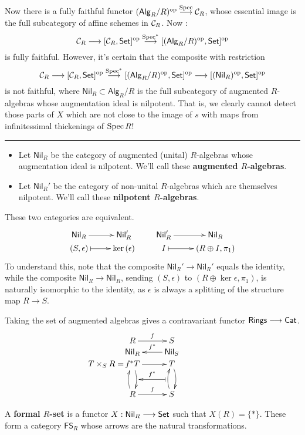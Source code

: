\documentclass[11pt]{article}
\newcommand{\RAlg}{\mathsf{Alg}_R}
\newcommand{\RNil}{\mathsf{Nil}_R}
\newcommand{\SNil}{\mathsf{Nil}_S}
\newcommand{\FSR}{\mathsf{FS}_R}
\begin{document}
\begin{itemise}
\begin{shaded}
Now there is a fully faithful functor $(\RAlg/R)^{\op}\overset{\spec}{\to}\calC_R$, whose essential image is the full subcategory of affine schemes in $\mathcal{C}_R$. Now :
\[\calC_R\to[\calC_R,\Set]^{\op}\overset{\spec^*}{\to}[(\RAlg/R)^{\op},\Set]^{\op}\]
is fully faithful. However, it's certain that  the composite with restriction
\[\calC_R\to[\calC_R,\Set]^{\op}\overset{\spec^*}{\to}[(\RAlg/R)^{\op},\Set]^{\op}\to[(\RNil)^{\op},\Set]^{\op}\]
is not faithful,
where $\RNil\subset \RAlg/R$ is the full subcategory of augmented $R$-algebras whose augmentation ideal is nilpotent. That is, we clearly cannot detect those parts of $X$ which are not close to the image of $s$ with maps from infinitessimal thickenings of $\operatorname{Spec} R$!
\end{shaded}
\hrule
\item
\begin{itemize}\squishlist
\item Let $\RNil$ be the category of augmented (unital) $R$-algebras whose augmentation ideal is nilpotent. We'll call these \textbf{augmented $R$-algebras}.
\item Let $\RNil'$ be the category of non-unital $R$-algebras which are themselves nilpotent. We'll call these \textbf{nilpotent $R$-algebras}.
\end{itemize}
\noindent These two categories are equivalent.
\[\xymatrix@R=0mm{
\ar[r]^-{}%
\RNil&%
\RNil'\\%
(S,\epsilon)%
\ar@{|->}[r]&
\ker(\epsilon)%
}\qquad \xymatrix@R=0mm{
\ar[r]^-{}%
\RNil'&%
\RNil\\%
I%
\ar@{|->}[r]&
(R\oplus I,\pi_1)%
}\]
To understand this, note that the composite $\RNil'\to\RNil'$ equals the identity, while the composite $\RNil\to\RNil$, sending $(S,\epsilon)$ to $(R\oplus \ker\epsilon,\pi_1)$, is naturally isomorphic to the identity, as $\epsilon$ is always a splitting of the structure map $R\to S$.
\item Taking the set of augmented algebras gives a contravariant functor $\operatorname{{\mathsf{Rings}}}\longrightarrow\operatorname{{\mathsf{Cat}}}$.
\[\xymatrix@R=0mm{
\ar[r]^-{f}%
R&%
S\\%
\ar[r];[]_-{f^*}%
\RNil&%
\SNil\\%
\makebox[0cm][r]{$T\times_S R=$\,}f^*T
\ar[r]
\ar@/^.5em/[dd]_{}="2"
&
T\ar@/^.5em/[dd]
\\\rule{0mm}{6mm}\\
R\ar@/^.5em/[uu]\ar[r]^-{f}
&
S\ar@/^.5em/[uu]^{}="1"
\ar@{|->}"1";"2"_-{f^*}
}\]
\item A \textbf{formal $R$-set} is a functor $X:\RNil\to\Set$ such that $X(R)=\{*\}$. These form a category $\FSR$ whose arrows are the natural transformations.


\end{itemise}
\end{document}
